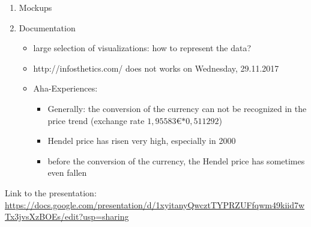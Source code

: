 \documentclass[11pt, twoside, BCOR=8mm, DIV=12]{scrartcl}
\begin{document}
\begin{enumerate}[label=\alph*)]
\item Mockups
\item Documentation
\begin{itemize}
    \item large selection of visualizations: how to represent the data?
    \item http://infosthetics.com/ does not works on Wednesday, 29.11.2017
    \item Aha-Experiences: 
    \begin{itemize}
    	\item Generally: the conversion of the currency can not be recognized in the price trend (exchange rate $ 1,95583$\euro $* 0,511292 $)
        \item Hendel price has risen very high, especially in 2000
        \item before the conversion of the currency, the Hendel price has sometimes even fallen
    \end{itemize}
\end{itemize}
\end{enumerate}

Link to the presentation:\\
\url{https://docs.google.com/presentation/d/1xyitanyQwcztTYPRZUFfqwm49kiid7wTx3jvsXzBOEs/edit?usp=sharing}
\end{document}
